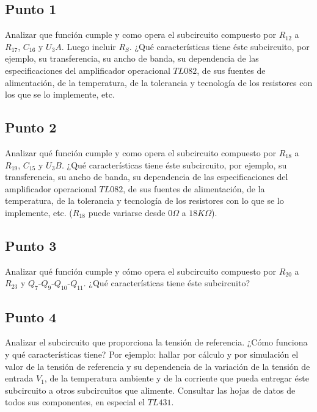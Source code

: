 
\subsection{Punto 1}

Analizar que función cumple y como opera el subcircuito compuesto por $R_{12}$ a $R_{17}$, $C_{16}$ y $U_{3}A$. Luego incluir $R_{S}$. ¿Qué características tiene éste subcircuito, por ejemplo, su transferencia, su ancho de banda, su dependencia de las especificaciones del amplificador operacional $TL082$, de sus fuentes de alimentación, de la temperatura, de la tolerancia y tecnología de los resistores con los que se lo implemente, etc.

\clearpage

\subsection{Punto 2}

 Analizar qué función cumple y como opera el subcircuito compuesto por $R_{18}$ a $R_{19}$, $C_{15}$ y $U_{3}B$. ¿Qué características tiene éste subcircuito, por ejemplo, su transferencia, su ancho de banda, su dependencia de las especificaciones del amplificador operacional $TL082$, de sus fuentes de alimentación, de la temperatura, de la tolerancia y tecnología de los resistores con lo que se lo implemente, etc. ($R_{18}$ puede variarse desde $0 \Omega$ a $18 K\Omega$).

\clearpage

\subsection{Punto 3}

Analizar qué función cumple y cómo opera el subcircuito compuesto por $R_{20}$ a $R_{23}$ y $Q_{7}$-$Q_{9}$-$Q_{10}$-$Q_{11}$. ¿Qué características tiene éste subcircuito?

\clearpage

\subsection{Punto 4}

Analizar el subcircuito que proporciona la tensión de referencia. ¿Cómo funciona y qué características tiene? Por ejemplo: hallar por cálculo y por simulación el valor de la tensión de referencia y su dependencia de la variación de la tensión de entrada $V_{1}$, de la temperatura ambiente y de la corriente que pueda entregar éste subcircuito a otros subcircuitos que alimente. Consultar las hojas de datos de todos sus componentes, en especial el $TL431$.

